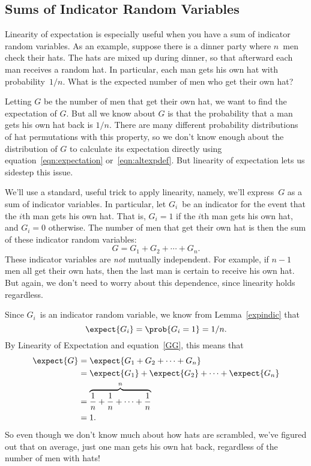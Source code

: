 \subsection{Sums of Indicator Random Variables}\label{sec:hat_check}

Linearity of expectation is especially useful when you have a sum of
indicator random variables.  As an example, suppose there is a dinner
party where $n$~men check their hats.  The hats are mixed up during
dinner, so that afterward each man receives a random hat.  In
particular, each man gets his own hat with probability~$1/n$.  What is
the expected number of men who get their own hat?

Letting $G$ be the number of men that get their own hat, we want to
find the expectation of $G$.  But all we know about $G$ is that the
probability that a man gets his own hat back is $1/n$.  There are many
different probability distributions of hat permutations with this
property, so we don't know enough about the distribution of $G$ to
calculate its expectation directly using
equation~\eqref{eqn:expectation} or~\eqref{eqn:altexpdef}.  But
linearity of expectation lets us sidestep this issue.

We'll use a standard, useful trick to apply linearity, namely, we'll
express~$G$ as a sum of indicator variables.  In particular, let
$G_i$~be an indicator for the event that the $i$th man gets his own
hat.  That is, $G_i = 1$ if the $i$th man gets his own hat, and $G_i =
0$ otherwise.  The number of men that get their own hat is then the
sum of these indicator random variables:
\begin{equation}\label{GG}
    G = G_1 + G_2 + \cdots + G_n.
\end{equation}
These indicator variables are \emph{not} mutually independent.  For
example, if $n-1$ men all get their own hats, then the last man is
certain to receive his own hat.  But again, we don't need to worry
about this dependence, since linearity holds regardless.

Since $G_i$~is an indicator random variable, we know from
Lemma~\ref{expindic} that
\begin{equation}
    \expect{G_i}= \prob{G_i=1} = 1/n.
\end{equation} 
By Linearity of Expectation and equation~\eqref{GG}, this means that
\begin{align*}
\expect{G} & = \expect{G_1 + G_2 + \cdots + G_n} \\
       & = \expect{G_1} + \expect{G_2} + \cdots + \expect{G_n}\\
       & = \overbrace{\frac{1}{n} + \frac{1}{n} + \cdots + \frac{1}{n}}^n \\
       &= 1.
\end{align*}
So even though we don't know much about how hats are scrambled, we've
figured out that on average, just one man gets his own hat back,
regardless of the number of men with hats!

